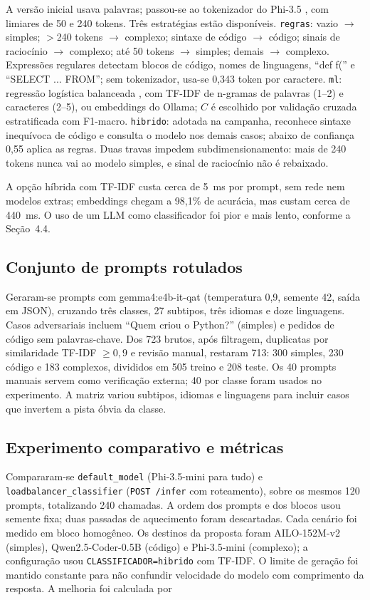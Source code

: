 \documentclass[12pt]{article}
\begin{document}
A versão inicial usava palavras; passou-se ao tokenizador do Phi-3.5 \cite{article:phi3}, com limiares de 50 e 240 tokens. Três estratégias estão disponíveis. \texttt{regras}: vazio $\rightarrow$ simples; $>$240 tokens $\rightarrow$ complexo; sintaxe de código $\rightarrow$ código; sinais de raciocínio $\rightarrow$ complexo; até 50 tokens $\rightarrow$ simples; demais $\rightarrow$ complexo. Expressões regulares detectam blocos de código, nomes de linguagens, ``def f('' e ``SELECT ... FROM''; sem tokenizador, usa-se 0,343 token por caractere. \texttt{ml}: regressão logística balanceada \cite{article:sklearn}, com TF-IDF de n-gramas de palavras (1--2) e caracteres (2--5), ou embeddings do Ollama; $C$ é escolhido por validação cruzada estratificada com F1-macro. \texttt{hibrido}: adotada na campanha, reconhece sintaxe inequívoca de código e consulta o modelo nos demais casos; abaixo de confiança 0,55 aplica as regras. Duas travas impedem subdimensionamento: mais de 240 tokens nunca vai ao modelo simples, e sinal de raciocínio não é rebaixado.

A opção híbrida com TF-IDF custa cerca de 5~ms por prompt, sem rede nem modelos extras; embeddings chegam a 98,1\% de acurácia, mas custam cerca de 440~ms. O uso de um LLM como classificador foi pior e mais lento, conforme a Seção~4.4.

\subsection{Conjunto de prompts rotulados}

Geraram-se prompts com gemma4:e4b-it-qat (temperatura 0,9, semente 42, saída em JSON), cruzando três classes, 27 subtipos, três idiomas e doze linguagens. Casos adversariais incluem ``Quem criou o Python?'' (simples) e pedidos de código sem palavras-chave. Dos 723 brutos, após filtragem, duplicatas por similaridade TF-IDF $\geq 0{,}9$ e revisão manual, restaram 713: 300 simples, 230 código e 183 complexos, divididos em 505 treino e 208 teste. Os 40 prompts manuais servem como verificação externa; 40 por classe foram usados no experimento. A matriz variou subtipos, idiomas e linguagens para incluir casos que invertem a pista óbvia da classe.

\subsection{Experimento comparativo e métricas}

Compararam-se \texttt{default\_model} (Phi-3.5-mini para tudo) e \texttt{loadbalancer\_classifier} (\texttt{POST /infer} com roteamento), sobre os mesmos 120 prompts, totalizando 240 chamadas. A ordem dos prompts e dos blocos usou semente fixa; duas passadas de aquecimento foram descartadas. Cada cenário foi medido em bloco homogêneo. Os destinos da proposta foram AILO-152M-v2 (simples), Qwen2.5-Coder-0.5B (código) e Phi-3.5-mini (complexo); a configuração usou \texttt{CLASSIFICADOR=hibrido} com TF-IDF. O limite de geração foi mantido constante para não confundir velocidade do modelo com comprimento da resposta. A melhoria foi calculada por
\end{document}
